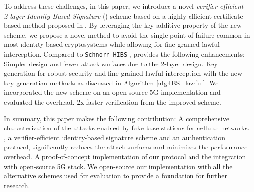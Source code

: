 To address these challenges, in this paper, we introduce a novel \emph{verifier-efficient 2-layer Identity-Based Signature} (\scheme{}) scheme based on a highly efficient certificate-based method proposed in \cite{ARIS}. By leveraging the key-additive property of the new scheme, we propose a novel method to avoid the single point of failure common in most identity-based cryptosystems while allowing for fine-grained lawful interception.
Compared to \texttt{Schnorr-HIBS} \cite{singla2021look}, \scheme{} provides the following enhancements:   Simpler design and fewer attack surfaces due to the 2-layer design.  Key generation for robust security and fine-grained lawful interception with the new key generation methods as discussed in Algorithm \ref{alg:IBS_lawful}.  We incorporated the new scheme on an open-source 5G implementation and evaluated the overhead.  2x faster verification from the improved scheme. 

In summary, this paper makes the following contribution:
 A comprehensive characterization of the attacks enabled by fake base stations for cellular networks.
 \scheme{}, a verifier-efficient identity-based signature scheme and an authentication protocol, significantly reduces the attack surfaces and minimizes the performance overhead. 
 A proof-of-concept implementation of our protocol and the integration with open-source 5G stack. We open-source our implementation \cite{E2IBS-github} with all the alternative schemes used for evaluation to provide a foundation for further research.